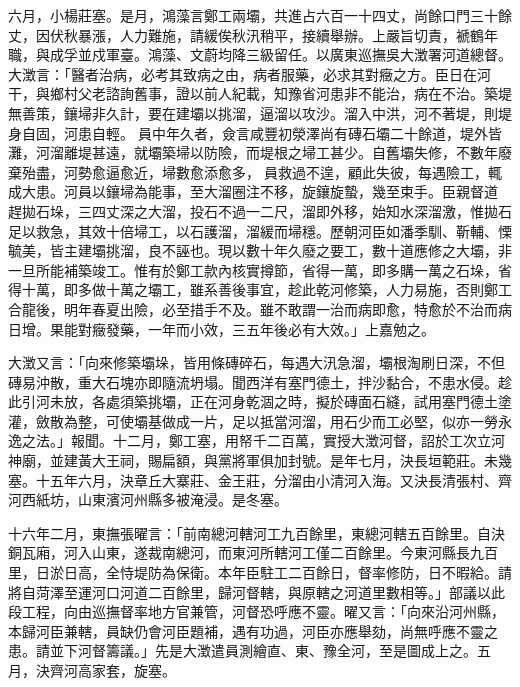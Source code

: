 \begin{pinyinscope}
六月，小楊莊塞。是月，鴻藻言鄭工兩壩，共進占六百一十四丈，尚餘口門三十餘丈，因伏秋暴漲，人力難施，請緩俟秋汛稍平，接續舉辦。上嚴旨切責，褫鶴年職，與成孚並戍軍臺。鴻藻、文蔚均降三級留任。以廣東巡撫吳大澂署河道總督。大澂言：「醫者治病，必考其致病之由，病者服藥，必求其對癥之方。臣日在河干，與鄉村父老諮詢舊事，證以前人紀載，知豫省河患非不能治，病在不治。築堤無善策，鑲埽非久計，要在建壩以挑溜，逼溜以攻沙。溜入中洪，河不著堤，則堤身自固，河患自輕。員中年久者，僉言咸豐初滎澤尚有磚石壩二十餘道，堤外皆灘，河溜離堤甚遠，就壩築埽以防險，而堤根之埽工甚少。自舊壩失修，不數年廢棄殆盡，河勢愈逼愈近，埽數愈添愈多，員救過不遑，顧此失彼，每遇險工，輒成大患。河員以鑲埽為能事，至大溜圈注不移，旋鑲旋蟄，幾至束手。臣親督道趕拋石垛，三四丈深之大溜，投石不過一二尺，溜即外移，始知水深溜激，惟拋石足以救急，其效十倍埽工，以石護溜，溜緩而埽穩。歷朝河臣如潘季馴、靳輔、慄毓美，皆主建壩挑溜，良不誣也。現以數十年久廢之要工，數十道應修之大壩，非一旦所能補築竣工。惟有於鄭工款內核實撙節，省得一萬，即多購一萬之石垛，省得十萬，即多做十萬之壩工，雖系善後事宜，趁此乾河修築，人力易施，否則鄭工合龍後，明年春夏出險，必至措手不及。雖不敢謂一治而病即愈，特愈於不治而病日增。果能對癥發藥，一年而小效，三五年後必有大效。」上嘉勉之。

大澂又言：「向來修築壩垛，皆用條磚碎石，每遇大汛急溜，壩根淘刷日深，不但磚易沖散，重大石塊亦即隨流坍塌。聞西洋有塞門德土，拌沙黏合，不患水侵。趁此引河未放，各處須築挑壩，正在河身乾涸之時，擬於磚面石縫，試用塞門德土塗灌，斂散為整，可使壩基做成一片，足以抵當河溜，用石少而工必堅，似亦一勞永逸之法。」報聞。十二月，鄭工塞，用帑千二百萬，實授大澂河督，詔於工次立河神廟，並建黃大王祠，賜扁額，與黨將軍俱加封號。是年七月，決長垣範莊。未幾塞。十五年六月，決章丘大寨莊、金王莊，分溜由小清河入海。又決長清張村、齊河西紙坊，山東濱河州縣多被淹浸。是冬塞。

十六年二月，東撫張曜言：「前南總河轄河工九百餘里，東總河轄五百餘里。自決銅瓦廂，河入山東，遂裁南總河，而東河所轄河工僅二百餘里。今東河縣長九百里，日淤日高，全恃堤防為保衛。本年臣駐工二百餘日，督率修防，日不暇給。請將自菏澤至運河口河道二百餘里，歸河督轄，與原轄之河道里數相等。」部議以此段工程，向由巡撫督率地方官兼管，河督恐呼應不靈。曜又言：「向來沿河州縣，本歸河臣兼轄，員缺仍會河臣題補，遇有功過，河臣亦應舉劾，尚無呼應不靈之患。請並下河督籌議。」先是大澂遣員測繪直、東、豫全河，至是圖成上之。五月，決齊河高家套，旋塞。


\end{pinyinscope}
